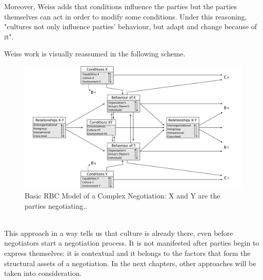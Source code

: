 \documentclass[../main.tex]{subfiles}
\begin{document}
Moreover, Weiss adds that conditions influence the parties but the parties themselves can act in order to modify some conditions. Under this reasoning, "cultures not only influence parties' behaviour, but adapt and change because of it"\autocite[289]{weiss}.

Weiss work is visually reassumed in the following scheme.

\begin{figure}[h]
    \centering\includegraphics[width=\textwidth]{images/rbc.pdf}
    \caption{Basic RBC Model of a Complex Negotiation: X and Y are the parties negotiating.\autocite[276]{weiss}.}
\end{figure}\\

This approach in a way tells us that culture is already there, even before negotiators start a negotiation process. It is not manifested after parties begin to express themselves: it is contextual and it belongs to the factors that form the structural assets of a negotiation. In the next chapters, other approaches will be taken into consideration.
\end{document}
